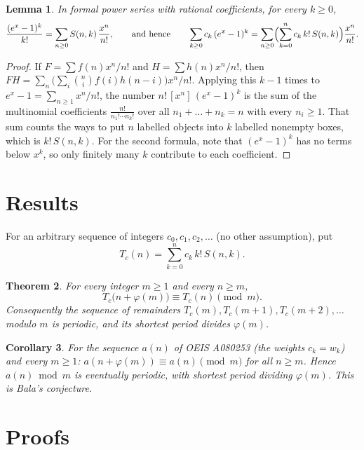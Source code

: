 \documentclass[11pt,a4paper]{article}
\newtheorem{theorem}{Theorem}[section]
\newtheorem{lemma}[theorem]{Lemma}
\newtheorem{corollary}[theorem]{Corollary}
\theoremstyle{definition}
\theoremstyle{remark}
\newcommand{\coeff}[2]{[x^{#1}]\,#2}
\begin{document}
\begin{lemma}\label{lem:egf}
In formal power series with rational coefficients, for every $k\ge0$,
\[
\frac{(e^x-1)^k}{k!}=\sum_{n\ge0}S(n,k)\,\frac{x^n}{n!},
\qquad\text{and hence}\qquad
\sum_{k\ge0}c_k\,(e^x-1)^k=\sum_{n\ge0}\Bigl(\sum_{k=0}^nc_k\,k!\,S(n,k)\Bigr)\frac{x^n}{n!}.
\]
\end{lemma}

\begin{proof}
If $F=\sum f(n)x^n/n!$ and $H=\sum h(n)x^n/n!$, then $FH=\sum_n\bigl(\sum_i\binom ni f(i)h(n-i)\bigr)x^n/n!$. Applying this
$k-1$ times to $e^x-1=\sum_{n\ge1}x^n/n!$, the number $n!\,\coeff{n}{(e^x-1)^k}$ is the sum of the multinomial coefficients
$\frac{n!}{n_1!\cdots n_k!}$ over all $n_1+\dots+n_k=n$ with every $n_i\ge1$. That sum counts the ways to put $n$ labelled
objects into $k$ labelled nonempty boxes, which is $k!\,S(n,k)$. For the second formula, note that $(e^x-1)^k$ has no
terms below $x^k$, so only finitely many $k$ contribute to each coefficient.
\end{proof}


\section{Results}\label{sec:results}

For an arbitrary sequence of integers $c_0,c_1,c_2,\dots$ (no other assumption), put
\begin{equation}\label{eq:transform}
T_c(n)=\sum_{k=0}^{n}c_k\,k!\,S(n,k).
\end{equation}

\begin{theorem}\label{thm:main}
For every integer $m\ge1$ and every $n\ge m$,
\[
T_c\bigl(n+\varphi(m)\bigr)\equiv T_c(n)\pmod m .
\]
Consequently the sequence of remainders $T_c(m),T_c(m+1),T_c(m+2),\dots$ modulo $m$ is periodic, and its shortest period
divides $\varphi(m)$.
\end{theorem}

\begin{corollary}\label{cor:seq}
For the sequence $a(n)$ of OEIS A080253 (the weights $c_k=w_k$) and every $m\ge1$:
$a(n+\varphi(m))\equiv a(n)\pmod m$ for all $n\ge m$. Hence $a(n)\bmod m$ is eventually periodic, with shortest period
dividing $\varphi(m)$. This is Bala's conjecture.
\end{corollary}

\section{Proofs}\label{sec:proofs}
\end{document}
